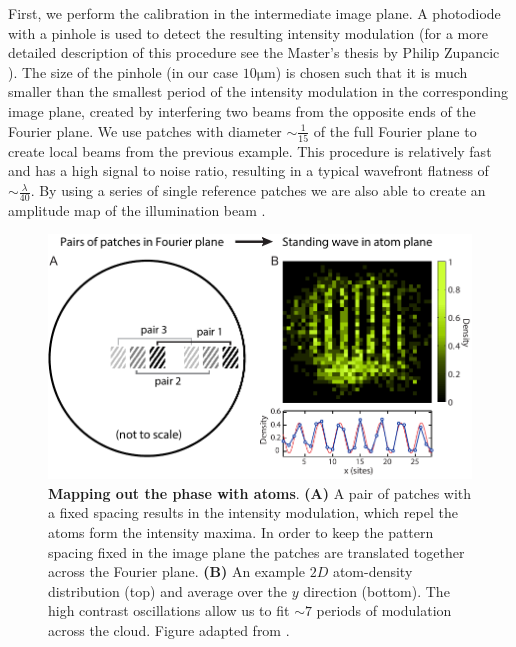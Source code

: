 First, we perform the calibration in the intermediate image plane. A photodiode with a pinhole is used to detect the resulting intensity modulation (for a more detailed description of this procedure see the Master’s thesis by Philip Zupancic \cite{ZupancicThesis}). The size of the pinhole (in our case $10 \mathrm{\mu m}$) is chosen such that it is much smaller than the smallest period of the intensity modulation in the corresponding image plane, created by interfering two beams from the opposite ends of the Fourier plane. We use patches with diameter $\sim \frac{1}{15}$ of the full Fourier plane to create local beams from the previous example. This procedure is relatively fast and has a high signal to noise ratio, resulting in a typical wavefront flatness of $\sim \frac{\lambda}{40}$. By using a series of single reference patches we are also able to create an amplitude map of the illumination beam \cite{Zupancic2016}.  

\begin{figure}[t]
	\centering
	\includegraphics[scale=1]{figures/DMD_cal_atoms.pdf}
	\caption{{\bf Mapping out the phase with atoms}. {\bf (A)} A pair of patches with a fixed spacing results in the intensity modulation, which repel the atoms form the intensity maxima. In order to keep the pattern spacing fixed in the image plane the patches are translated together across the Fourier plane. {\bf (B)} An example $2D$ atom-density distribution (top) and average over the $y$ direction (bottom). The high contrast oscillations allow us to fit $\sim 7$ periods of modulation across the cloud.  Figure adapted from \cite{Zupancic2016}.}
	\label{fig:DMD_FPcal}
\end{figure}

